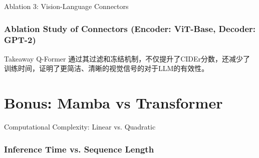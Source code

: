 \documentclass{beamer}
\begin{document}
\begin{CJK}{UTF8}{gbsn}
\begin{frame}[fragile]{Ablation 3: Vision-Language Connectors}
    \frametitle{Ablation Study of Connectors (Encoder: ViT-Base, Decoder: GPT-2)}
    \vfill
    \begin{block}{Takeaway}
        Q-Former 通过其过滤和冻结机制，不仅提升了CIDEr分数，还减少了训练时间，证明了更简洁、清晰的视觉信号的对于LLM的有效性。
    \end{block}
\end{frame}


\section{Bonus: Mamba vs Transformer}

\begin{frame}{Computational Complexity: Linear vs. Quadratic}
    \frametitle{Inference Time vs. Sequence Length}
    \begin{figure}[H]
        \centering
    \end{figure}
    

\end{frame}
\end{CJK}
\end{document}
